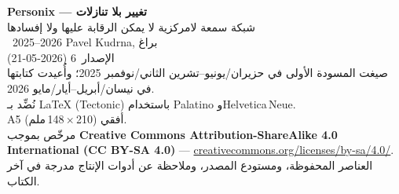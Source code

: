 \thispagestyle{empty}
\ifdefined\printmode\vspace*{\fill}\else{}\fi
\begin{flushleft}\small\sffamily
\textbf{Personix --- تغيير بلا تنازلات}\\[0.3em]
شبكة سمعة لامركزية لا يمكن الرقابة عليها ولا إفسادها\\[1.4em]

\textcopyright\ 2025--2026 Pavel Kudrna, براغ\\[0.4em]

الإصدار~6 (2026-05-21)\\
صيغت المسودة الأولى في حزيران/يونيو--تشرين الثاني/نوفمبر 2025؛ وأُعيدت كتابتها في نيسان/أبريل--أيار/مايو 2026.\\[1.4em]

نُضِّد بـ \LaTeX{} (Tectonic) باستخدام Palatino وHelvetica\,Neue.\\
A5 أفقي (210\,$\times$\,148\,ملم).\\[1.4em]

مرخّص بموجب \textbf{Creative Commons Attribution-ShareAlike 4.0
International (CC BY-SA 4.0)} ---
\href{https://creativecommons.org/licenses/by-sa/4.0/}{creativecommons.org/licenses/by-sa/4.0/}.
العناصر المحفوظة، ومستودع المصدر، وملاحظة عن أدوات الإنتاج
مدرجة في آخر الكتاب.
\end{flushleft}
\ifdefined\printmode\else{}\fi
\clearpage
